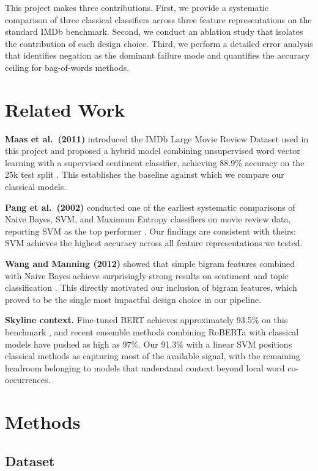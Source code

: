 \documentclass[11pt]{article}
\begin{document}
This project makes three contributions. First, we provide a systematic comparison of three classical classifiers across three feature representations on the standard IMDb benchmark. Second, we conduct an ablation study that isolates the contribution of each design choice. Third, we perform a detailed error analysis that identifies negation as the dominant failure mode and quantifies the accuracy ceiling for bag-of-words methods.

\section{Related Work}

\textbf{Maas et al.\ (2011)} introduced the IMDb Large Movie Review Dataset used in this project and proposed a hybrid model combining unsupervised word vector learning with a supervised sentiment classifier, achieving 88.9\% accuracy on the 25k test split \citep{maas2011learning}. This establishes the baseline against which we compare our classical models.

\textbf{Pang et al.\ (2002)} conducted one of the earliest systematic comparisons of Naive Bayes, SVM, and Maximum Entropy classifiers on movie review data, reporting SVM as the top performer \citep{pang2002thumbs}. Our findings are consistent with theirs: SVM achieves the highest accuracy across all feature representations we tested.

\textbf{Wang and Manning (2012)} showed that simple bigram features combined with Naive Bayes achieve surprisingly strong results on sentiment and topic classification \citep{wang2012baselines}. This directly motivated our inclusion of bigram features, which proved to be the single most impactful design choice in our pipeline.

\textbf{Skyline context.} Fine-tuned BERT achieves approximately 93.5\% on this benchmark \citep{devlin2019bert}, and recent ensemble methods combining RoBERTa with classical models have pushed as high as 97\%. Our 91.3\% with a linear SVM positions classical methods as capturing most of the available signal, with the remaining headroom belonging to models that understand context beyond local word co-occurrences.

\section{Methods}

\subsection{Dataset}
\end{document}
